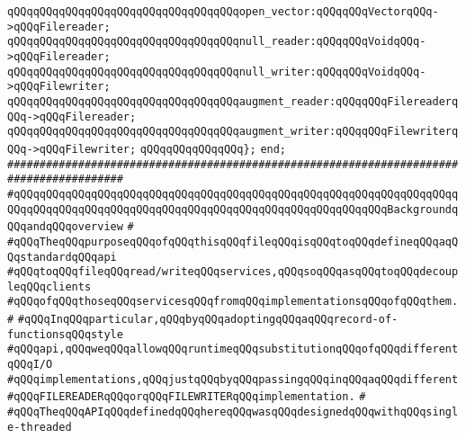 \verb|qQQqqQQqqQQqqQQqqQQqqQQqqQQqqQQqqQQqopen_vector:qQQqqQQqVectorqQQq->qQQqFilereader;|\newline
\newline
\verb|qQQqqQQqqQQqqQQqqQQqqQQqqQQqqQQqqQQqnull_reader:qQQqqQQqVoidqQQq->qQQqFilereader;|\newline
\verb|qQQqqQQqqQQqqQQqqQQqqQQqqQQqqQQqqQQqnull_writer:qQQqqQQqVoidqQQq->qQQqFilewriter;|\newline
\newline
\verb|qQQqqQQqqQQqqQQqqQQqqQQqqQQqqQQqqQQqaugment_reader:qQQqqQQqFilereaderqQQq->qQQqFilereader;|\newline
\verb|qQQqqQQqqQQqqQQqqQQqqQQqqQQqqQQqqQQqaugment_writer:qQQqqQQqFilewriterqQQq->qQQqFilewriter;|\newline
\newline
\verb|qQQqqQQqqQQqqQQq};|\newline
\verb|end;|\newline
\newline
\verb|########################################################################################|\newline
\verb|#qQQqqQQqqQQqqQQqqQQqqQQqqQQqqQQqqQQqqQQqqQQqqQQqqQQqqQQqqQQqqQQqqQQqqQQqqQQqqQQqqQQqqQQqqQQqqQQqqQQqqQQqqQQqqQQqqQQqqQQqqQQqqQQqBackgroundqQQqandqQQqoverview|\newline
\verb|#|\newline
\verb|#qQQqTheqQQqpurposeqQQqofqQQqthisqQQqfileqQQqisqQQqtoqQQqdefineqQQqaqQQqstandardqQQqapi|\newline
\verb|#qQQqtoqQQqfileqQQqread/writeqQQqservices,qQQqsoqQQqasqQQqtoqQQqdecoupleqQQqclients|\newline
\verb|#qQQqofqQQqthoseqQQqservicesqQQqfromqQQqimplementationsqQQqofqQQqthem.|\newline
\verb|#|\newline
\verb|#qQQqInqQQqparticular,qQQqbyqQQqadoptingqQQqaqQQqrecord-of-functionsqQQqstyle|\newline
\verb|#qQQqapi,qQQqweqQQqallowqQQqruntimeqQQqsubstitutionqQQqofqQQqdifferentqQQqI/O|\newline
\verb|#qQQqimplementations,qQQqjustqQQqbyqQQqpassingqQQqinqQQqaqQQqdifferent|\newline
\verb|#qQQqFILEREADERqQQqorqQQqFILEWRITERqQQqimplementation.|\newline
\verb|#|\newline
\verb|#qQQqTheqQQqAPIqQQqdefinedqQQqhereqQQqwasqQQqdesignedqQQqwithqQQqsingle-threaded|\newline

